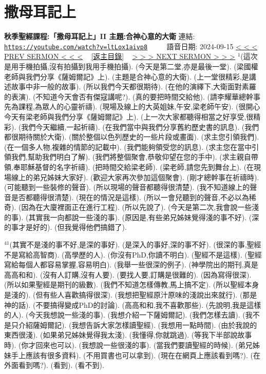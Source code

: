 \documentclass{book}
\begin{document}
\section{撒母耳記上}
\label{sec:ltLox1aivp8}
\textbf{秋季聖經課程:「撒母耳記上」II 主題:合神心意的大衛}
\newline
\newline
連結: \href{https://youtube.com/watch?v=ltLox1aivp8}{\texttt{https://youtube.com/watch?v=ltLox1aivp8}} ~~~~ 語音日期: 2024-09-15
\newline
\newline
\hyperref[sec:EjR8UEB4pjs]{\small{< < < PREV SERMON < < <}}
~
\hyperref[sec:index]{\small{[返主目錄]}}
~
\hyperref[sec:A6e_76MEqBA]{\small{> > > NEXT SERMON > > >}}
\newline
\newline
$^{1}$(這次是用手機拍攝,沒有拍攝到我用手機拍攝).
(今天是第二堂,亦是最後一堂).
(梁國權老師與我們分享《薩姆爾記》上).
(主題是合神心意的大衛).
(上一堂很精彩,是講述故事中非一般的故事).
(所以我們今天都很期待).
(在他的演繹下,大衛面對素羅的表演).
(不知道今天會否有傑寇講呢?).
(真的要把時間交給他).
(請李耀華總幹事先為課程,為眾人的心靈祈禱).
(現場及線上的大英姐妹,午安,梁老師午安).
(很開心今天有梁老師與我們分享《薩姆爾記》上).
(上一次大家都聽得相當之好享受,很精彩).
(我們今天繼續,一起祈禱).
(在我們當中與我們分享舊約歷史書的訊息).
(我們都很期待關於大衛).
(關於整個以色列歷史的一些片段或畫面).
(求主您引領我們).
(在一個多人物,複雜的情節的記載中).
(我們能夠領受您的訊息).
(求主您在當中引領我們,幫助我們明白了解).
(我們將整個聚會,恭敬仰望在您的手中).
(求主親自帶領,奉耶穌基督的名字祈禱).
(把時間交給梁老師).
(梁老師,請您先到舞台上).
(在現場線上的弟兄姊妹大家好).
(歡迎大家再次參加這個聚會).
(剛才總幹事在祈禱時).
(可能聽到一些裝修的聲音).
(所以現場的聲音都聽得很清楚).
(我不知道線上的聲音是否都聽得很清楚).
(現在的情況是這樣).
(所以一會兒聽到的聲音,不必以為稀奇).
(因為在大廈裡面正在進行工程).
(所以先說了).
(今天是第二次,我會說一些淺的事).
(其實我一向都說一些淺的事).
(原因是,有些弟兄姊妹覺得淺的事不好).
(深的事才是好的).
(但我覺得他們搞錯了).

$^{41}$(其實不是淺的事不好,是深的事好).
(是深入的事好,深的事不好).
(很深的事,聖經不是寫給高智商).
(高學歷的人).
(你沒有PhD,你讀不明白).
(聖經不是這樣).
(聖經寫給每個人都容易掌握,容易明白).
(我舉一些很深的例子).
(神學院出的期刊,真是高高和和).
(沒有人訂購,沒有人要).
(要找人要,訂購是很難的).
(因為寫得很深).
(所以如果聖經是期刊的級數).
(我們不知道怎樣傳教,馬上搞不定).
(所以聖經本身是淺的).
(但有些人喜歡搞得很深).
(我想把聖經原汁原味的淺說出來就行).
(那是神的話).
(不要搞得變成PhD的討論).
(高高和和,我不喜歡那些).
(先說明,我是這樣的人).
(今天我想說一些淺的事).
(我想介紹一下薩姆爾記).
(我們怎樣去讀).
(我不是只介紹薩姆爾記).
(我想告訴大家怎樣讀聖經).
(我想用一點時間).
(由於我說的東西很淺).
(如果弟兄姊妹覺得我太淺).
(我懂得,你就跳過).
(等我下半部說故事時).
(你才回來也可以).
(我想說一些很淺的事).
(當我們要讀聖經的時候).
(弟兄姊妹手上應該有很多資料).
(不用買書也可以拿到).
(現在在網頁上應該看到嗎?).
(在外面看到嗎?).
(看到).
(看不到).
\end{document}
